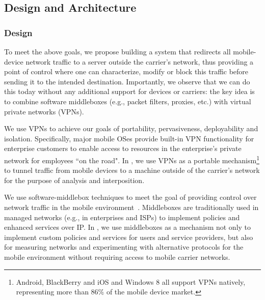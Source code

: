 \subsection{Design and Architecture}

\subsubsection{Design}
To meet the above goals, we propose building a system that redirects all mobile-device 
network traffic to a server outside the carrier's network, thus providing a point of control 
where one can characterize, modify or block this traffic before sending it to the intended 
destination. Importantly, we observe that we can do this today without any additional 
support for devices or carriers: the key idea is to combine software middleboxes (e.g., 
packet filters, proxies, etc.) with virtual private networks (VPNs). 

We use VPNs to achieve our goals of portability, pervasiveness, deployability 
and isolation. Specifically, major
 mobile OSes provide built-in VPN functionality for enterprise
 customers to enable access to resources in
 the enterprise's private network for employees ``on the road". 
In \meddle, we use VPNs as a portable mechanism\footnote{Android, BlackBerry and iOS and Windows 8 all support VPNs natively, representing more than 86\% of the mobile device market\cite{gartner-phone-share}.} to tunnel traffic from mobile devices to a machine outside of the carrier's network for the purpose of analysis and interposition. 

We use software-middlebox techniques to meet the goal of providing control over network traffic in the mobile 
environment~\cite{sherry:middleboxes}. Middleboxes are traditionally used in managed networks (e.g., in enterprises and ISPs) to implement policies and enhanced services over IP. In \meddle, we use middleboxes as a mechanism not only to implement custom policies and services for users and service providers, but also for measuring networks and experimenting with alternative protocols for the mobile environment without requiring access to mobile carrier networks. 



